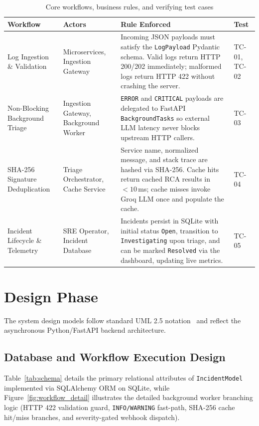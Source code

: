 \documentclass[12pt,a4paper,oneside]{report}
\begin{document}
\begin{table}[H]
\centering\footnotesize\singlespacing
\caption{Core workflows, business rules, and verifying test cases}\label{tab:workflows}
\begin{tabularx}{\linewidth}{@{}>{\raggedright\arraybackslash}p{2.7cm} >{\raggedright\arraybackslash}p{2.2cm} X l@{}}
\toprule
\textbf{Workflow} & \textbf{Actors} & \textbf{Rule Enforced} & \textbf{Test}\\
\midrule
Log Ingestion \& Validation & Microservices, Ingestion Gateway &
  Incoming JSON payloads must satisfy the \texttt{LogPayload} Pydantic schema. Valid logs return HTTP 200/202 immediately; malformed logs return HTTP 422 without crashing the server. &
  TC-01, TC-02\\
Non-Blocking Background Triage & Ingestion Gateway, Background Worker &
  \texttt{ERROR} and \texttt{CRITICAL} payloads are delegated to FastAPI \texttt{BackgroundTasks} so external LLM latency never blocks upstream HTTP callers. &
  TC-03\\
SHA-256 Signature Deduplication & Triage Orchestrator, Cache Service &
  Service name, normalized message, and stack trace are hashed via SHA-256. Cache hits return cached RCA results in $<10$\,ms; cache misses invoke Groq LLM once and populate the cache. &
  TC-04\\
Incident Lifecycle \& Telemetry & SRE Operator, Incident Database &
  Incidents persist in SQLite with initial status \texttt{Open}, transition to \texttt{Investigating} upon triage, and can be marked \texttt{Resolved} via the dashboard, updating live metrics. &
  TC-05\\
\bottomrule
\end{tabularx}
\end{table}


\chapter{Design Phase}
The system design models follow standard UML 2.5 notation~\cite{uml} and reflect the asynchronous Python/FastAPI backend architecture.

\section{Database and Workflow Execution Design}
Table~\ref{tab:schema} details the primary relational attributes of \texttt{IncidentModel} implemented via SQLAlchemy ORM on SQLite, while Figure~\ref{fig:workflow_detail} illustrates the detailed background worker branching logic (HTTP 422 validation guard, \texttt{INFO/WARNING} fast-path, SHA-256 cache hit/miss branches, and severity-gated webhook dispatch).
\end{document}
